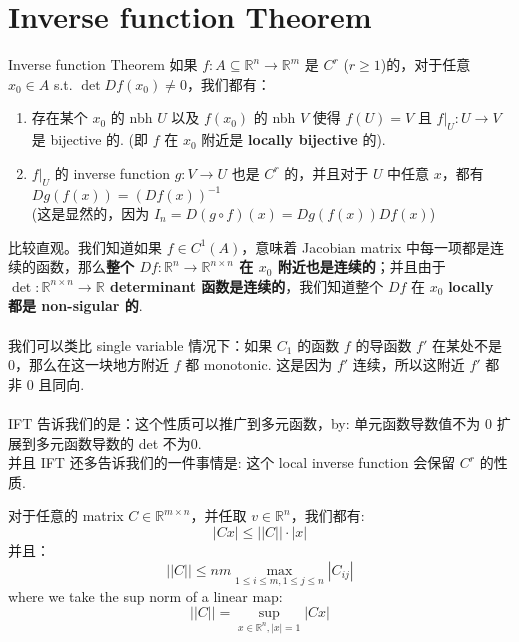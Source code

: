 \documentclass[lang=cn,11pt]{elegantbook}
\begin{document}
\section{Inverse function Theorem}
\begin{theorem}{Inverse function Theorem} \label{IFT}
    如果 $f: A \subseteq \mathbb{R}^n \rightarrow \mathbb{R}^m$ 是 $C^r$ 
 ($r \geq 1$)的，对于任意 $x_0 \in A$ s.t. $\det{Df(x_0)} \not= 0$，我们都有：
    \begin{enumerate}
        \item 存在某个 $x_0$ 的 nbh $U$ 以及 $f(x_0)$ 的 nbh $V$ 使得 $f(U) = V$ 且 $f|_U : U \rightarrow V$ 是 bijective 的. (即 $f$ 在 $x_0$ 附近是 \textbf{locally bijective }的).
        \item $f|_U$ 的 inverse function $g: V \rightarrow U$ 也是 $C^r$ 的，并且对于 $U$ 中任意 $x$，都有 $Dg(f(x)) = (Df(x))^{-1}$ \\ 
        (这是显然的，因为 $I_n = D (g \circ f) (x) = Dg(f(x))Df(x)$)
    \end{enumerate}
\end{theorem}
\begin{remark}
    比较直观。我们知道如果 $f \in C^1(A)$，意味着 Jacobian matrix 中每一项都是连续的函数，那么\textbf{整个 $Df: \mathbb{R}^n \rightarrow \mathbb{R}^{n \times n}$ 在 $x_0$ 附近也是连续的}；并且由于 \textbf{$\det :\mathbb{R}^{n \times n} \rightarrow \mathbb{R}$ determinant 函数是连续的}，我们知道整个 $Df$ 在 $x_0$ \textbf{locally 都是 non-sigular 的}. \\\\
    我们可以类比 single variable 情况下：如果 $C_1$ 的函数 $f$ 的导函数 $f'$ 在某处不是 0，那么在这一块地方附近 $f$ 都 monotonic. 这是因为 $f'$ 连续，所以这附近 $f'$ 都非 0 且同向.\\\\
    IFT 告诉我们的是：这个性质可以推广到多元函数，by: 单元函数导数值不为 0 扩展到多元函数导数的 det 不为0.\\
    并且 IFT 还多告诉我们的一件事情是: 这个 local inverse function 会保留 $C^r$ 的性质.\\
\end{remark}

\begin{lemma}
    对于任意的 matrix $C \in \mathbb{R}^{m \times n}$，并任取 $v \in \mathbb{R}^n$，我们都有:
    $$
    |Cx| \leq ||C|| \cdot |x|
    $$
    并且： 
    $$
||C||\leq nm \max_{1 \leq i \leq m, 1\leq j \leq n} |C_{ij}|
$$
where we take the sup norm of a linear map:
$$
||C|| = \sup_{x \in \mathbb{R}^n, |x| = 1} |Cx|
$$
\end{lemma}
\end{document}
